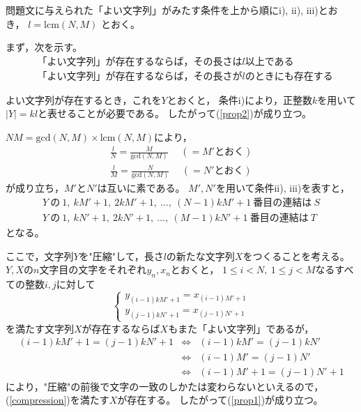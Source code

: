\documentclass{article}
\begin{document}
問題文に与えられた「よい文字列」がみたす条件を上から順にi), ii), iii)とおき，
$l = \mathrm{lcm}(N, M)$ とおく。

まず，次を示す。
\begin{eqnarray}
    \label{prop2}
    &\mbox{「よい文字列」が存在するならば，その長さは$l$以上である} \\
    \label{prop1}
    &\mbox{「よい文字列」が存在するならば，その長さが$l$のときにも存在する}
\end{eqnarray}

よい文字列が存在するとき，これを$Y$とおくと，
条件i)により，正整数$k$を用いて$|Y| = kl$と表せることが必要である。
したがって(\ref{prop2})が成り立つ。

$NM = \mathrm{gcd}(N, M) \times \mathrm{lcm}(N, M)$により，
\begin{eqnarray*}
    \frac{l}{N} = \frac{M}{\mathrm{gcd}(N, M)} \hspace{15pt} (= M' \mbox{とおく}) \\
    \frac{l}{M} = \frac{N}{\mathrm{gcd}(N, M)} \hspace{15pt} (= N' \mbox{とおく})
\end{eqnarray*}
が成り立ち，$M'$と$N'$は互いに素である。
$M', N'$を用いて条件ii), iii)を表すと，
\begin{eqnarray*}
    Y\ \mbox{の}\ 1,\ kM'+1,\ 2kM'+1,\ \ldots ,\ (N-1)kM'+1\ \mbox{番目の連結は}\ S \\
    Y\ \mbox{の}\ 1,\ kN'+1,\ 2kN'+1,\ \ldots ,\ (M-1)kN'+1\ \mbox{番目の連結は}\ T
\end{eqnarray*}
となる。

ここで，文字列$Y$を"圧縮"して，長さ$l$の新たな文字列$X$をつくることを考える。
$Y, X$の$n$文字目の文字をそれぞれ$y_n, x_n$とおくと，
$1 \leq i < N,\ 1 \leq j < M$なるすべての整数$i, j$に対して
\begin{equation}
    \label{compression}
    \begin{cases}
        y_{(i - 1)kM' + 1} = x_{(i - 1)M' + 1} \\
        y_{(j - 1)kN' + 1} = x_{(j - 1)N' + 1}
    \end{cases}
\end{equation}
を満たす文字列$X$が存在するならば$X$もまた「よい文字列」であるが，
\begin{eqnarray}
    (i - 1)kM' + 1 = (j - 1)kN' + 1
        &\Longleftrightarrow& (i - 1)kM' = (j - 1)kN' \nonumber \\
        &\Longleftrightarrow& (i - 1)M' = (j - 1)N' \nonumber \\
        \label{eq1}
        &\Longleftrightarrow& (i - 1)M' + 1 = (j - 1)N' + 1
\end{eqnarray}
により，"圧縮"の前後で文字の一致のしかたは変わらないといえるので，
(\ref{compression})を満たす$X$が存在する。
したがって(\ref{prop1})が成り立つ。
\end{document}
